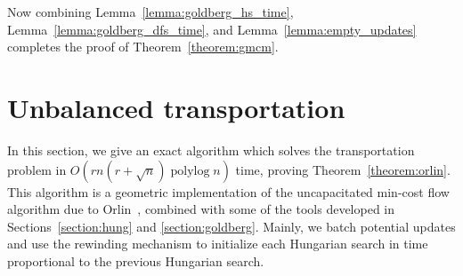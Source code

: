 \documentclass[a4paper,UKenglish]{socg-lipics-v2018}
\def\polylog{\mathop{\mathrm{polylog}}}
\theoremstyle{plain}
\numberwithin{figure}{section}
\begin{document}

%
Now combining Lemma~\ref{lemma:goldberg_hs_time}, Lemma~\ref{lemma:goldberg_dfs_time}, and
Lemma~\ref{lemma:empty_updates}
completes the proof of Theorem~\ref{theorem:gmcm}.


\section{Unbalanced transportation}


In this section, we give an exact algorithm which solves the transportation
problem in $O(rn(r + \sqrt{n})\polylog n)$ time, proving
Theorem~\ref{theorem:orlin}.
This algorithm is a geometric implementation of the uncapacitated min-cost flow
algorithm due to Orlin~\cite{O93}, combined with some of the tools developed
in Sections~\ref{section:hung} and \ref{section:goldberg}.
Mainly, we batch potential updates and use the rewinding mechanism to
initialize each Hungarian search in time proportional to the previous
Hungarian search.
\end{document}
